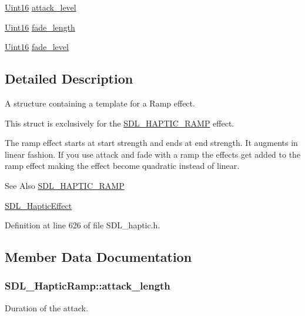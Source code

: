 \begin{DoxyCompactItemize}
\item 
\hyperlink{_s_d_l__stdinc_8h_a31fcc0a076c9068668173ee26d33e42b}{Uint16} \hyperlink{struct_s_d_l___haptic_ramp_a755933bbda14ae9b53c574b9fe6291a0}{attack\-\_\-level}
\item 
\hyperlink{_s_d_l__stdinc_8h_a31fcc0a076c9068668173ee26d33e42b}{Uint16} \hyperlink{struct_s_d_l___haptic_ramp_ad58a8f7cfdf659b45f0503fc56db7436}{fade\-\_\-length}
\item 
\hyperlink{_s_d_l__stdinc_8h_a31fcc0a076c9068668173ee26d33e42b}{Uint16} \hyperlink{struct_s_d_l___haptic_ramp_a66b586f2e6a23a085a7b2854f61752c5}{fade\-\_\-level}
\end{DoxyCompactItemize}


\subsection{Detailed Description}
A structure containing a template for a Ramp effect. 

This struct is exclusively for the \hyperlink{_s_d_l__haptic_8h_af10eb937a64a8f602e9c46682ac0d868}{S\-D\-L\-\_\-\-H\-A\-P\-T\-I\-C\-\_\-\-R\-A\-M\-P} effect.

The ramp effect starts at start strength and ends at end strength. It augments in linear fashion. If you use attack and fade with a ramp the effects get added to the ramp effect making the effect become quadratic instead of linear.

\begin{DoxySeeAlso}{See Also}
\hyperlink{_s_d_l__haptic_8h_af10eb937a64a8f602e9c46682ac0d868}{S\-D\-L\-\_\-\-H\-A\-P\-T\-I\-C\-\_\-\-R\-A\-M\-P} 

\hyperlink{union_s_d_l___haptic_effect}{S\-D\-L\-\_\-\-Haptic\-Effect} 
\end{DoxySeeAlso}


Definition at line 626 of file S\-D\-L\-\_\-haptic.\-h.



\subsection{Member Data Documentation}
\hypertarget{struct_s_d_l___haptic_ramp_adbcd7ffb05016d442c73e81cc0fcbbd2}{
\subsubsection[{attack\-\_\-length}]{ S\-D\-L\-\_\-\-Haptic\-Ramp\-::attack\-\_\-length}}\label{struct_s_d_l___haptic_ramp_adbcd7ffb05016d442c73e81cc0fcbbd2}
Duration of the attack. 

